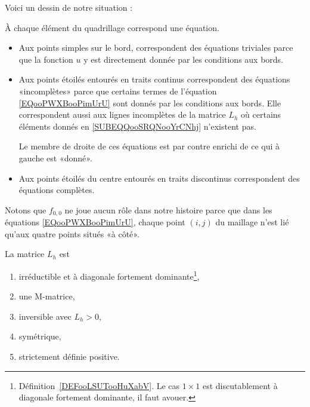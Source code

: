 Voici un dessin de notre situation :

\begin{center}
	
\end{center}

À chaque élément du quadrillage correspond une équation.
\begin{itemize}
	\item
	      Aux points simples sur le bord, correspondent des équations triviales parce que la fonction \(u \) y est directement donnée par les conditions aux bords.
	\item
	      Aux points étoilés entourés en traits continus correspondent des équations «incomplètes» parce que certains termes de l'équation \eqref{EQooPWXBooPimUrU} sont donnés par les conditions aux bords. Elle correspondent aussi aux lignes incomplètes de la matrice \( L_h\) où certains éléments donnés en \eqref{SUBEQQooSRQNooYrCNhj} n'existent pas.

	      Le membre de droite de ces équations est par contre enrichi de ce qui à gauche est «donné».
	\item
	      Aux points étoilés du centre entourés en traits discontinus correspondent des équations complètes.
\end{itemize}

Notons que \( f_{0,0}\) ne joue aucun rôle dans notre histoire parce que dans les équations \eqref{EQooPWXBooPimUrU}, chaque point \( (i,j)\) du maillage n'est lié qu'aux quatre points situés «à côté».


\begin{proposition} \label{PROPooWGTRooVjWhYY}
	La matrice \(L_h\) est
	\begin{enumerate}
		\item
		      irréductible et à diagonale fortement dominante\footnote{Définition~\ref{DEFooLSUTooHuXabV}. Le cas \( 1\times 1\) est discutablement à diagonale fortement dominante, il faut avouer.},
		\item       \label{ITEMooOOHPooDsvUPP}
		      une M-matrice,
		\item
		      inversible avec \( L_{h}>0\),
		\item
		      symétrique,
		\item
		      strictement définie positive.
	\end{enumerate}
\end{proposition}

